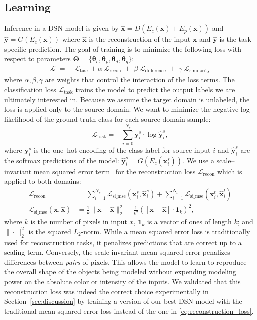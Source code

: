 \documentclass{article}
\newcommand{\bs}[1]{\boldsymbol{\mathbf{#1}}}
\begin{document}
\subsection{Learning}
\label{sec:learning}
Inference in a DSN model is given by $\hat{\bs x} = D(E_c(\bs x) + E_p(\bs x))$
and $\hat{\bs y} = G(E_c(\bs x))$
where $\hat{\bs x}$ is the reconstruction of the input $\bs x$ and $\hat{\bs y}$ is the
task-specific prediction. 
The goal of training is to minimize the following loss with respect to parameters ${\bs \Theta = \{\bs \theta_c, \bs \theta_p, \bs \theta_d, \bs \theta_g\}}$:
\begin{align}
\mathcal{L} \;=\; & \mathcal {L}_\mathrm{task} +
\alpha \;\mathcal {L}_\mathrm{recon}\;+ \;  \beta\; \mathcal {L}_\mathrm{difference}\; +\;
\gamma\; \mathcal {L}_\mathrm{similarity}
\end{align}
 where $\alpha, \beta, \gamma$ are weights that control the interaction of the loss terms.
The classification loss $\mathcal{L}_\mathrm{task}$ trains the model
to predict the output labels we are ultimately interested in. Because we assume
the target domain is unlabeled, the loss is applied only to the source domain.
We want to minimize the negative log--likelihood of the ground truth class for each source domain sample:
\begin{equation}
\mathcal {L}_\mathrm{task} = -\sum_{i=0}^{N_s}\bs y_i^s\cdot \log \hat{\bs y}_i^s,
\end{equation}
where $\bs{y}_i^s$ is the one--hot encoding of the class label for source input $i$
and $\hat{\bs y}_i^s$ are the softmax predictions of the model: $\hat{\bs y}_i^s = G(E_c(\bs x_i^s))$.
We use a scale--invariant mean squared error term~\cite{eigen2014depth} for the
reconstruction loss $\mathcal{L}_\mathrm{recon}$ which is applied to
both domains:
\begin{align}
\label{eq:reconstruction_loss}
\mathcal{L}_\mathrm{recon} &=
\sum_{i=1}^{N_s} \mathcal{L}_\mathrm{si\_mse}({\bs x}_i^s, \hat{{\bs x}}_i^s)
+ \sum_{i=1}^{N_t} \mathcal{L}_\mathrm{si\_mse}({\bs x}_i^t, \hat{{\bs x}}_i^t) \\
\mathcal{L}_\mathrm{si\_mse}({\bs x}, \hat{{\bs x}}) &=
\frac{1}{k} \|{\bs x}-\hat{{\bs x}}\|_2^2 - \frac{1}{k^2}([{\bs x}-\hat{{\bs x}}] \cdot {\bs 1}_k)^2,
\end{align}
where  $k$ is the number of pixels in input $x$, $\bs 1_k$ is a vector of ones of
length $k$; and $\|\cdot\|_2^2$ is the squared $L_2$-norm. While a mean squared error
loss is traditionally used for reconstruction tasks, it penalizes predictions that
are correct up to a scaling term. Conversely, the
scale-invariant mean squared error penalizes differences between \textit{pairs}
of pixels. This allows the model to learn to reproduce the overall shape of the objects
being modeled without expending modeling power on the absolute color or intensity
of the inputs. We validated that this reconstruction loss was indeed the correct choice experimentally in Section~\ref{sec:discussion} by training a version of our best DSN model with the traditional mean squared error loss instead of the one in \autoref{eq:reconstruction_loss}.
\end{document}
